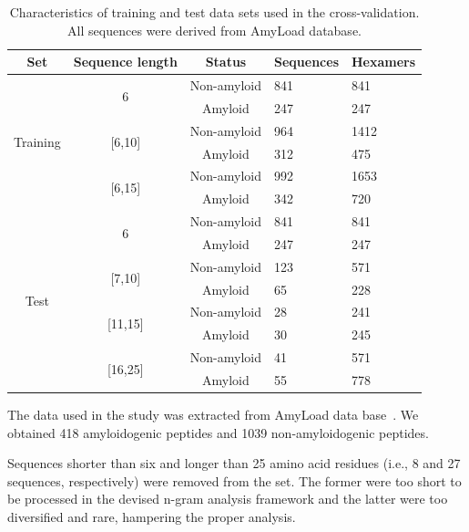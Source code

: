 \documentclass[fleqn,10pt,twoside]{gcb15submission}
\begin{document}
\begin{table}[h]
\centering
\small
\caption{Characteristics of training and test data sets used in the 
cross-validation. All sequences were derived from AmyLoad database.}
\label{tab:data_sets}
\begin{tabular}{cccll}
\toprule
Set & Sequence length & Status & Sequences & Hexamers \\ 
\midrule
\multirow{6}{*}{Training} & \multirow{2}{*}{6} & Non-amyloid & 841 & 841 
\\
 &  & \cellcolor[gray]{0.85}Amyloid & \cellcolor[gray]{0.85}247 & 
\cellcolor[gray]{0.85}247 \\
 \cline{2-5}
 & \multirow{2}{*}{{[}6,10{]}} & Non-amyloid & 964 & 1412 \\
 &  & \cellcolor[gray]{0.85}Amyloid & \cellcolor[gray]{0.85}312 & 
\cellcolor[gray]{0.85}475 \\
 \cline{2-5}
 & \multirow{2}{*}{{[}6,15{]}} & Non-amyloid & 992 & 1653 \\
 &  & \cellcolor[gray]{0.85}Amyloid & \cellcolor[gray]{0.85}342 & 
\cellcolor[gray]{0.85}720 \\
 \hline
 \hline
\multirow{8}{*}{Test} & \multirow{2}{*}{6} & Non-amyloid & 841 & 841 \\
 &  & \cellcolor[gray]{0.85}Amyloid & \cellcolor[gray]{0.85}247 & 
\cellcolor[gray]{0.85}247 \\
 \cline{2-5}
 & \multirow{2}{*}{{[}7,10{]}} & Non-amyloid & 123 & 571 \\
 &  & \cellcolor[gray]{0.85}Amyloid & \cellcolor[gray]{0.85}65 & 
\cellcolor[gray]{0.85}228 \\
 \cline{2-5}
 & \multirow{2}{*}{{[}11,15{]}} & Non-amyloid & 28 & 241 \\
 &  & \cellcolor[gray]{0.85}Amyloid & \cellcolor[gray]{0.85}30 & 
\cellcolor[gray]{0.85}245 \\
 \cline{2-5}
 & \multirow{2}{*}{{[}16,25{]}} & Non-amyloid & 41 & 571 \\
 &  & \cellcolor[gray]{0.85}Amyloid & \cellcolor[gray]{0.85}55 & 
\cellcolor[gray]{0.85}778 \\
 \bottomrule
\end{tabular}
\end{table}

The data used in the study was extracted from AmyLoad data 
base~\citep{wozniak_amyload:_2015}. We obtained 418 amyloidogenic peptides and 
1039 non-amyloidogenic peptides.

  Sequences shorter than six and longer than 25 amino acid residues (i.e., 8 and 
27 sequences, respectively) were removed from the set. The former were too short 
to be processed in the devised n-gram analysis framework and the latter were too 
diversified and rare, hampering the proper analysis.
\end{document}
